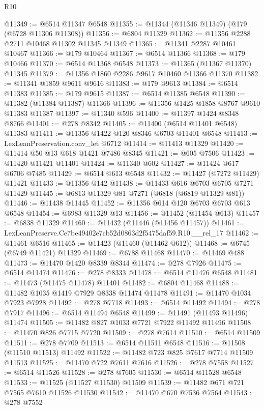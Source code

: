 \begin{lexlean}{R10}
\begin{coremodule}
@11349 := @6514 @11347 @6548
@11355 := @11344 (@11346 @11349) (@179 (@6728 @11306 @11308))
@11356 := @6804 @11329
@11362 := @11356 @2288 @2711 @10468 @11302 @11345 @11349
@11365 := @11341 @2287 @10461 @10467
@11366 := @179 @10464
@11367 := @6514 @11366
@11368 := @179 @10466
@11370 := @6514 @11368 @6548
@11373 := @11365 (@11367 @11370) @11345
@11379 := @11356 @1860 @2286 @9617 @10460 @11366 @11370
@11382 := @11341 @1859 @9611 @9616
@11383 := @179 @9613
@11384 := @6514 @11383
@11385 := @179 @9615
@11387 := @6514 @11385 @6548
@11390 := @11382 (@11384 @11387) @11366
@11396 := @11356 @1425 @1858 @8767 @9610 @11383 @11387
@11397 := @11340 @596
@11400 := @11397 @1424 @8348 @8766
@11401 := @278 @8342
@11405 := @11400 (@6514 @11401 @6548) @11383
@11411 := @11356 @1422 @120 @8346 @6703 @11401 @6548
@11413 := LexLeanPreservation.conv_let @6712
@11414 := @11413 @11329
@11420 := @11414 @50 @13 @618 @1421 @7486 @8345
@11421 := @605 @7506
@11423 := @11420 @11421 @11401
@11424 := @11340 @602
@11427 := @11424 @617 @6706 @7485
@11429 := @6514 @613 @6548
@11432 := @11427 (@7272 @11429) @11421
@11433 := @11356 @142
@11438 := @11433 @616 @6703 @6705 @7271 @11429
@11445 := @6813 @11329 @81 @7271 (@6818 (@6819 @11329 @81))
@11446 := @11438 @11445
@11452 := @11356 @614 @120 @6703 @6703 @613 @6548
@11454 := @6983 @11329 @13
@11456 := @11452 (@11454 @613)
@11457 := @6838 @11329
@11460 := @11432 (@11446 (@11456 @11457))
@11461 := LexLeanPreserve.Ce7be49402e7cb52d0863d2f5475daf59.R10.__rel_17
@11462 := @11461 @6516
@11465 := @11423 (@11460 (@11462 @612))
@11468 := @6745 (@6749 @11421) @11329
@11469 := @6788 @11468
@11470 := @11469 @488
@11473 := @11470 @1420 @8339 @8344
@11474 := @278 @7926
@11475 := @6514 @11474
@11476 := @278 @8333
@11478 := @6514 @11476 @6548
@11481 := @11473 (@11475 @11478) @11401
@11482 := @6804 @11468
@11488 := @11482 @1035 @1419 @7929 @8338 @11474 @11478
@11491 := @11470 @1034 @7923 @7928
@11492 := @278 @7718
@11493 := @6514 @11492
@11494 := @278 @7917
@11496 := @6514 @11494 @6548
@11499 := @11491 (@11493 @11496) @11474
@11505 := @11482 @827 @1033 @7721 @7922 @11492 @11496
@11508 := @11470 @826 @7715 @7720
@11509 := @278 @7614
@11510 := @6514 @11509
@11511 := @278 @7709
@11513 := @6514 @11511 @6548
@11516 := @11508 (@11510 @11513) @11492
@11522 := @11482 @723 @825 @7617 @7714 @11509 @11513
@11525 := @11470 @722 @7611 @7616
@11526 := @278 @7558
@11527 := @6514 @11526
@11528 := @278 @7605
@11530 := @6514 @11528 @6548
@11533 := @11525 (@11527 @11530) @11509
@11539 := @11482 @671 @721 @7565 @7610 @11526 @11530
@11542 := @11470 @670 @7536 @7564
@11543 := @278 @7552

\end{coremodule}
\end{lexlean}
